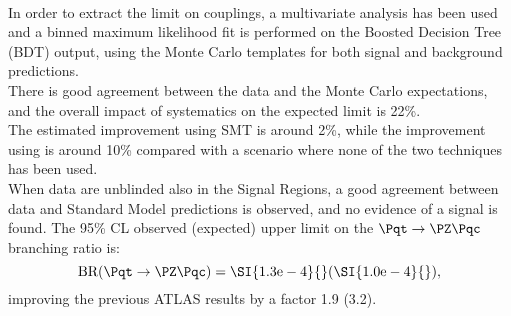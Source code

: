 \vspace{\baselineskip}
\\In order to extract the limit on \tZc couplings, a multivariate analysis has been used and a binned maximum likelihood fit is performed on the Boosted Decision Tree (BDT) output, using the Monte Carlo templates for both signal and background predictions.\\
There is good agreement between the data and the Monte Carlo expectations, 
and the overall impact of systematics on the expected limit is 22\%.\\
The estimated improvement using SMT is around 2\%, while the improvement using \DLrc is around 10\% compared with a scenario where none of the two techniques has been used.
\vspace{\baselineskip}
\\When data are unblinded also in the Signal Regions, a good agreement between data and Standard Model predictions is observed, and no evidence of a signal is found. The 95\% CL observed (expected) upper limit on the $\Pqt\rightarrow\PZ\Pqc$ branching ratio is:
\begin{equation*}
\mathrm{BR (\Pqt\rightarrow\PZ\Pqc)=\SI{1.3e-4}{}(\SI{1.0e-4}{})},
\end{equation*}
improving the previous ATLAS results by a factor 1.9 (3.2).

